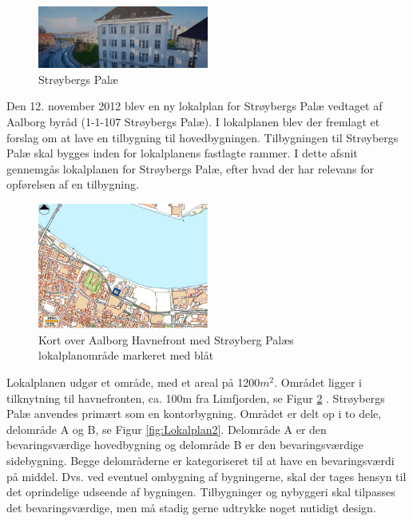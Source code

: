 \begin{figure}[H] 
\centering
\includegraphics[width=0.50\textwidth]{billeder/Lokalplan3}
\caption{Strøybergs Palæ}
\label{fig:Lokalplan3}
\end{figure}



Den 12. november 2012 blev en ny lokalplan for Strøybergs Palæ vedtaget af Aalborg byråd (1-1-107 Strøybergs Palæ). I lokalplanen blev der fremlagt et forslag om at lave en tilbygning til hovedbygningen. Tilbygningen til Strøybergs Palæ skal bygges inden for lokalplanens fastlagte rammer. I dette afsnit gennemgås lokalplanen for Strøybergs Palæ, efter hvad der har relevans for opførelsen af en tilbygning. 

\begin{figure}[H] 
\centering
\includegraphics[width=0.50\textwidth]{billeder/Lokalplan1}
\caption{Kort over Aalborg Havnefront med Strøyberg Palæs lokalplanområde markeret med blåt}
\label{fig:Lokalplan1}
\end{figure}

Lokalplanen udgør et område, med et areal på 1200$ m^{2} $. Området ligger i tilknytning til havnefronten, ca. 100m fra Limfjorden, se Figur \ref{fig:Lokalplan1} . Strøybergs Palæ anvendes primært som en kontorbygning. Området er delt op i to dele, delområde A og B, se Figur \ref{fig:Lokalplan2}. Delområde A er den bevaringsværdige hovedbygning og delområde B er den bevaringsværdige sidebygning. Begge delområderne er kategoriseret til at have en bevaringsværdi på middel. Dvs. ved eventuel ombygning af bygningerne, skal der tages hensyn til det oprindelige udseende af bygningen. Tilbygninger og nybyggeri skal tilpasses det bevaringsværdige, men må stadig gerne udtrykke noget nutidigt design.



